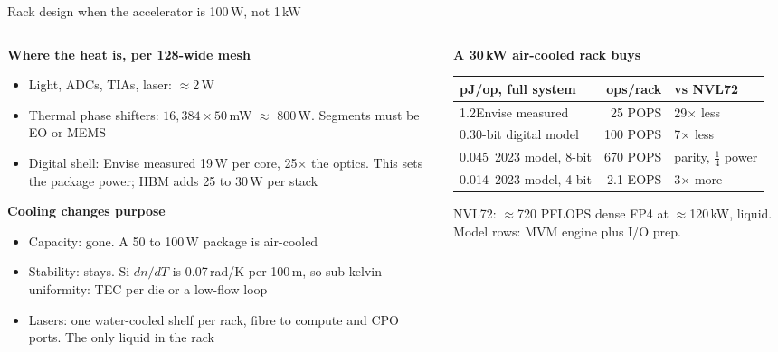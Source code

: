\documentclass[aspectratio=169,10pt]{beamer}
\newcommand{\src}[1]{{\scriptsize\color{slate}#1}}
\begin{document}
\begin{frame}{Rack design when the accelerator is 100\,W, not 1\,kW}
\begin{columns}[T]
\begin{column}{0.5\textwidth}
{\scriptsize
\textbf{Where the heat is, per 128-wide mesh}
\begin{itemize}\setlength{\itemsep}{2pt}
  \item Light, ADCs, TIAs, laser: $\approx$2\,W
  \item \alert{Thermal} phase shifters: $16{,}384\times50$\,mW $\approx$ 800\,W. Segments must be EO or MEMS
  \item Digital shell: Envise measured 19\,W per core, 25$\times$ the optics. \alert{This} sets the package power; HBM adds 25 to 30\,W per stack
\end{itemize}
\vspace{3pt}
\textbf{Cooling changes purpose}
\begin{itemize}\setlength{\itemsep}{2pt}
  \item Capacity: gone. A 50 to 100\,W package is air-cooled
  \item Stability: stays. Si $dn/dT$ is 0.07\,rad/K per 100\,\textmu m, so sub-kelvin uniformity: TEC per die or a low-flow loop
  \item Lasers: one water-cooled shelf per rack, fibre to compute and CPO ports. The only liquid in the rack
\end{itemize}}
\end{column}
\begin{column}{0.48\textwidth}
{\scriptsize
\textbf{A 30\,kW air-cooled rack buys}
\begin{center}
\setlength{\tabcolsep}{4pt}\renewcommand{\arraystretch}{0.95}
\begin{tabular}{@{}lrl@{}}
\toprule
pJ/op, full system & ops/rack & vs NVL72\\
\midrule
1.2\quad Envise measured & 25 POPS & 29$\times$ less\\
0.30\quad 8-bit digital model & 100 POPS & 7$\times$ less\\
0.045\ 2023 model, 8-bit & 670 POPS & parity, $\tfrac14$ power\\
0.014\ 2023 model, 4-bit & 2.1 EOPS & 3$\times$ more\\
\bottomrule
\end{tabular}
\end{center}
\src{NVL72: $\approx$720 PFLOPS dense FP4 at $\approx$120\,kW, liquid. Model rows: MVM engine plus I/O prep.}\\[2pt]
}
\end{column}
\end{columns}
\end{frame}
\end{document}
